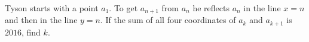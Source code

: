 Tyson starts with a point $a_1$. To get $a_{n+1}$ from $a_n$ he reflects $a_n$ in the line $x=n$ and then in the line $y=n$. If the sum of all four coordinates of $a_k$ and $a_{k+1}$ is $2016$, find $k$.
